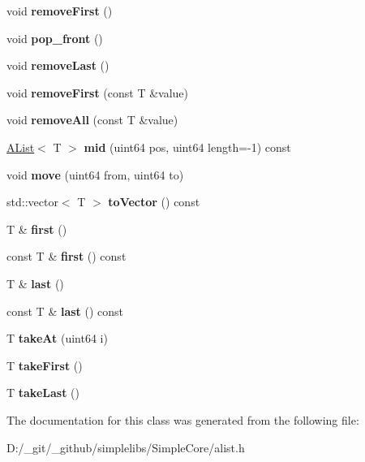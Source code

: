 \begin{DoxyCompactItemize}
void {\bfseries remove\+First} ()
\item 
\mbox{\label{class_a_list_a2240edc5f38fa7e57a868bb30b747c51}} 
void {\bfseries pop\+\_\+front} ()
\item 
\mbox{\label{class_a_list_aff8e5c3e3f879ea5c8d6d9e29b321fc9}} 
void {\bfseries remove\+Last} ()
\item 
\mbox{\label{class_a_list_aa4ac4af0fb772a55168ddcba13c508c3}} 
void {\bfseries remove\+First} (const T \&value)
\item 
\mbox{\label{class_a_list_a32b8779cd05c79fe74f79c854b54a5f7}} 
void {\bfseries remove\+All} (const T \&value)
\item 
\mbox{\label{class_a_list_a6cd644da12a4691fb03ce1bf33ab2dbb}} 
\mbox{\hyperlink{class_a_list}{A\+List}}$<$ T $>$ {\bfseries mid} (uint64 pos, uint64 length=-\/1) const
\item 
\mbox{\label{class_a_list_af091a1d7ddb9a3b9becc827da8eded09}} 
void {\bfseries move} (uint64 from, uint64 to)
\item 
\mbox{\label{class_a_list_a6e1a3cea40a3046c16643680e8581552}} 
std\+::vector$<$ T $>$ {\bfseries to\+Vector} () const
\item 
\mbox{\label{class_a_list_aca24663d0fe32d878cd4a214ade18372}} 
T \& {\bfseries first} ()
\item 
\mbox{\label{class_a_list_a1cf9c09ee90e96a5f72a39344f8240be}} 
const T \& {\bfseries first} () const
\item 
\mbox{\label{class_a_list_a41b07290930bbfa06ec02f9106a52b74}} 
T \& {\bfseries last} ()
\item 
\mbox{\label{class_a_list_ab6c0fc542c318f68199ef3b4d97c82f4}} 
const T \& {\bfseries last} () const
\item 
\mbox{\label{class_a_list_a26e974f6914da40b2e783edeac3c0665}} 
T {\bfseries take\+At} (uint64 i)
\item 
\mbox{\label{class_a_list_af2da906ed8c9bf282fc9f6f726864d9f}} 
T {\bfseries take\+First} ()
\item 
\mbox{\label{class_a_list_aa210fddef3bf64dd63dd68f3d5f2fe05}} 
T {\bfseries take\+Last} ()
\end{DoxyCompactItemize}


The documentation for this class was generated from the following file\+:\begin{DoxyCompactItemize}
\item 
D\+:/\+\_\+git/\+\_\+github/simplelibs/\+Simple\+Core/alist.\+h\end{DoxyCompactItemize}
